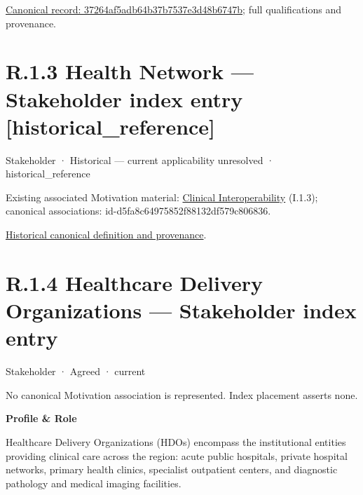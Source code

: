 {\footnotesize \href{../../../../continuum/motivation/stakeholder/37264af5adb64b37b7537e3d48b6747b.md}{Canonical record: 37264af5adb64b37b7537e3d48b6747b}; full qualifications and provenance.}\par
\section*{R.1.3 Health Network — Stakeholder index entry [historical\_reference]}
\label{navigation:R.1.3}

\label{element:55e57c01dfe146a2a225228b31196862}
{\small Stakeholder · Historical — current applicability unresolved · historical\_reference}\par
{\small Existing associated Motivation material: \hyperref[element:babb9f5d63d8435890c1db3579ec78d9]{Clinical Interoperability} (I.1.3); canonical associations: id-d5fa8c64975852f88132df579c806836.}\par
\href{../../../../continuum/motivation/stakeholder/55e57c01dfe146a2a225228b31196862.md}{Historical canonical definition and provenance}.\par
\section*{R.1.4 Healthcare Delivery Organizations — Stakeholder index entry}
\label{navigation:R.1.4}

\label{element:31a8e1054c02483a9d5e314a91a91364}
{\small Stakeholder · Agreed · current}\par
No canonical Motivation association is represented. Index placement asserts none.\par

\par\medskip\textbf{Profile \& Role}\par


Healthcare Delivery Organizations (HDOs) encompass the institutional entities providing clinical care across the region: acute public hospitals, private hospital networks, primary health clinics, specialist outpatient centers, and diagnostic pathology and medical imaging facilities.



